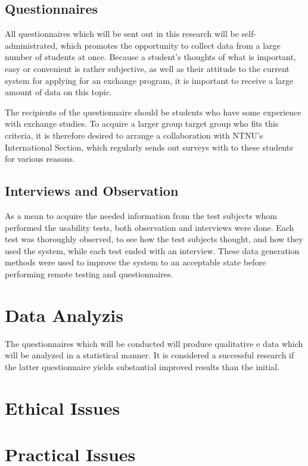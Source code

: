 \subsection{Questionnaires}

All questionnaires which will be sent out in this research will be self-administrated, which promotes the opportunity to collect data from a large number of students at once. Because a student's thoughts of what is important, easy or convenient is rather subjective, as well as their attitude to the current system for applying for an exchange program, it is important to receive a large amount of data on this topic.

The recipients of the questionnaire should be students who have some experience with exchange studies. To acquire a larger group target group who fits this criteria, it is therefore desired to arrange a collaboration with NTNU's International Section, which regularly sends out surveys with to these students for various reasons.


\subsection{Interviews and Observation}

As a mean to acquire the needed information from the test subjects whom performed the usability tests, both observation and interviews were done. Each test was thoroughly observed, to see how the test subjects thought, and how they used the system, while each test ended with an interview. These data generation methods were used to improve the system to an acceptable state before performing remote testing and questionnaires.

\section{Data Analyzis}

The questionnaires which will be conducted will produce qualitative e data which will be analyzed in a statistical manner. It is considered a successful research if the latter questionnaire yields substantial improved results than the initial. 

\section{Ethical Issues}

\section{Practical Issues}

\cleardoublepage